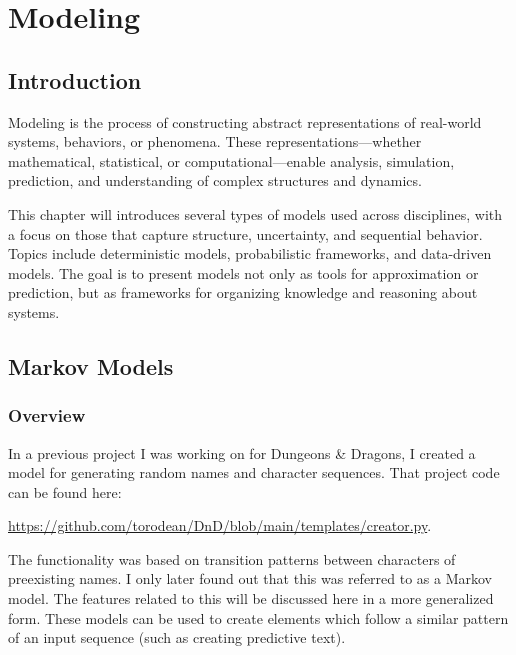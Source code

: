\chapter{Modeling}
\thispagestyle{fancy}
\label{chap:modeling}





\section{Introduction}

Modeling is the process of constructing abstract representations of real-world systems, behaviors, or phenomena. These representations—whether mathematical, statistical, or computational—enable analysis, simulation, prediction, and understanding of complex structures and dynamics.

This chapter will introduces several types of models used across disciplines, with a focus on those that capture structure, uncertainty, and sequential behavior. Topics include deterministic models, probabilistic frameworks, and data-driven models. The goal is to present models not only as tools for approximation or prediction, but as frameworks for organizing knowledge and reasoning about systems.










\section{Markov Models}

\subsection{Overview}

In a previous project I was working on for Dungeons \& Dragons, I created a model for generating random names and character sequences. That project code can be found here: 
\begin{center}
\url{https://github.com/torodean/DnD/blob/main/templates/creator.py}. 
\end{center}
The functionality was based on transition patterns between characters of preexisting names. I only later found out that this was referred to as a Markov model. The features related to this will be discussed here in a more generalized form. These models can be used to create elements which follow a similar pattern of an input sequence (such as creating predictive text).

